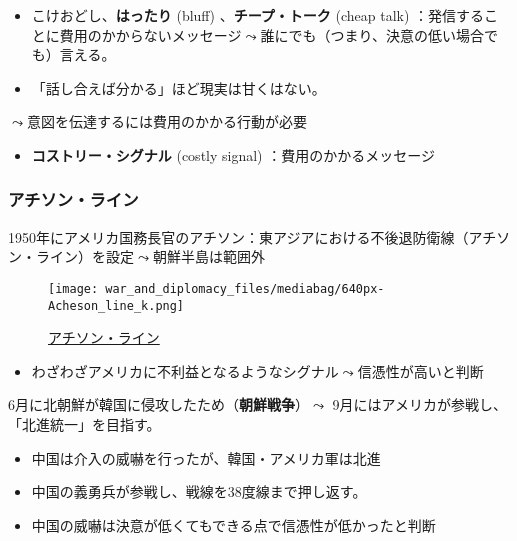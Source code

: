 \documentclass[
  xelatex,
  ja=standard]{bxjsarticle}
\providecommand{\tightlist}{%
  \setlength{\itemsep}{0pt}\setlength{\parskip}{0pt}}\usepackage{longtable,booktabs,array}
\begin{document}
\begin{itemize}
\tightlist
\item
  こけおどし、\textbf{はったり} (bluff) 、\textbf{チープ・トーク} (cheap
  talk)
  ：発信することに費用のかからないメッセージ\(\leadsto\)誰にでも（つまり、決意の低い場合でも）言える。
\item
  「話し合えば分かる」ほど現実は甘くはない。
\end{itemize}

\(\leadsto\)意図を伝達するには費用のかかる行動が必要

\begin{itemize}
\tightlist
\item
  \textbf{コストリー・シグナル} (costly signal) ：費用のかかるメッセージ
\end{itemize}

\hypertarget{ux30a2ux30c1ux30bdux30f3ux30e9ux30a4ux30f3}{%
\subsubsection{アチソン・ライン}\label{ux30a2ux30c1ux30bdux30f3ux30e9ux30a4ux30f3}}

1950年にアメリカ国務長官のアチソン：東アジアにおける不後退防衛線（アチソン・ライン）を設定\(\leadsto\)朝鮮半島は範囲外

\begin{figure}[htpb]

{\centering \texttt{[image: war\_and\_diplomacy\_files/mediabag/640px-Acheson\_line\_k.png]}

}

\caption{\href{https://commons.wikimedia.org/wiki/File:Acheson_line_ko.svg}{アチソン・ライン}}

\end{figure}

\begin{itemize}
\tightlist
\item
  わざわざアメリカに不利益となるようなシグナル\(\leadsto\)信憑性が高いと判断
\end{itemize}

6月に北朝鮮が韓国に侵攻したため（\textbf{朝鮮戦争}）\(\leadsto\)
9月にはアメリカが参戦し、「北進統一」を目指す。

\begin{itemize}
\tightlist
\item
  中国は介入の威嚇を行ったが、韓国・アメリカ軍は北進
\item
  中国の義勇兵が参戦し、戦線を38度線まで押し返す。
\item
  中国の威嚇は決意が低くてもできる点で信憑性が低かったと判断
\end{itemize}
\end{document}
